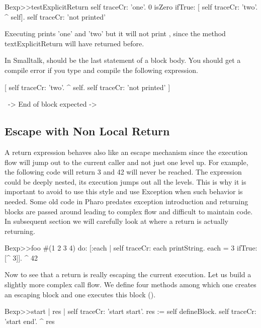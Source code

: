 \documentclass[a4paper,10pt,twoside]{book}
\begin{document}
\begin{code}{}
Bexp>>testExplicitReturn
	self traceCr: 'one'.
	0 isZero ifTrue: [ self traceCr: 'two'. ^ self].
	self traceCr: 'not printed'
\end{code}

Executing   prints 'one' and 'two' but it will not print , since the method textExplicitReturn will have returned before.


In Smalltalk, \ct{^} should be the last statement of a block body. You should get a compile error if you type and compile the following expression. 

\begin{code}{}
[ self traceCr: 'two'.
  ^ self.  
  self traceCr: 'not printed' ]
  
    ~-> End of block expected ->
\end{code}


\subsection{Escape with Non Local Return}
A return expression behaves also like an escape mechanism since the execution flow will jump out to the current caller and not just one level up. For example, the following code will return 3 and 42 will never be reached. The expression \ct{[ ^3 ]} could be deeply nested, its execution jumps out all the levels. This is why it is important to avoid to use this style and use Exception when such behavior is needed. Some old code in Pharo predates exception introduction and returning blocks are passed around leading to complex flow and difficult to maintain code. In subsequent section we will carefully look at where a return is actually returning.

\begin{code}{}
Bexp>>foo
	#(1 2 3 4) do: [:each | 
					self traceCr: each printString. 
					each = 3 
						ifTrue: [^ 3]].						
	^ 42
\end{code}

Now to see that a return is really escaping the current execution. Let us build a slightly more complex call flow. 
We define four methods among which one creates an escaping block  and one executes this block ().

\begin{code}{}
Bexp>>start
	| res |
	self traceCr: 'start start'.
	res := self defineBlock.
	self traceCr: 'start end'.
	^ res
\end{code}
\end{document}
